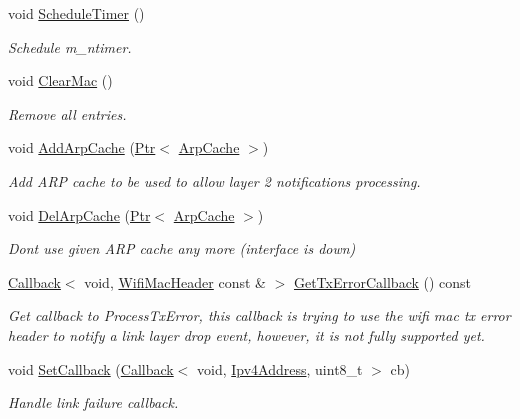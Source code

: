 \begin{DoxyCompactItemize}
void \hyperlink{classns3_1_1dsr_1_1DsrRouteCache_a1464bf3f9e4391942447afd1ce11c219}{Schedule\+Timer} ()
\begin{DoxyCompactList}\small\item\em Schedule m\+\_\+ntimer. \end{DoxyCompactList}\item 
void \hyperlink{classns3_1_1dsr_1_1DsrRouteCache_a901a02e075ccbd32082b1cb8cfe91607}{Clear\+Mac} ()
\begin{DoxyCompactList}\small\item\em Remove all entries. \end{DoxyCompactList}\item 
void \hyperlink{classns3_1_1dsr_1_1DsrRouteCache_aec3d7186e2b737e3f6d65a24145a3168}{Add\+Arp\+Cache} (\hyperlink{classns3_1_1Ptr}{Ptr}$<$ \hyperlink{classns3_1_1ArpCache}{Arp\+Cache} $>$)
\begin{DoxyCompactList}\small\item\em Add A\+RP cache to be used to allow layer 2 notifications processing. \end{DoxyCompactList}\item 
void \hyperlink{classns3_1_1dsr_1_1DsrRouteCache_ab2f4b5f658cd9e9829dc68290799fe1e}{Del\+Arp\+Cache} (\hyperlink{classns3_1_1Ptr}{Ptr}$<$ \hyperlink{classns3_1_1ArpCache}{Arp\+Cache} $>$)
\begin{DoxyCompactList}\small\item\em Don\textquotesingle{}t use given A\+RP cache any more (interface is down) \end{DoxyCompactList}\item 
\hyperlink{classns3_1_1Callback}{Callback}$<$ void, \hyperlink{classns3_1_1WifiMacHeader}{Wifi\+Mac\+Header} const \& $>$ \hyperlink{classns3_1_1dsr_1_1DsrRouteCache_add47d5b114fc61306122d31427e7a944}{Get\+Tx\+Error\+Callback} () const 
\begin{DoxyCompactList}\small\item\em Get callback to Process\+Tx\+Error, this callback is trying to use the wifi mac tx error header to notify a link layer drop event, however, it is not fully supported yet. \end{DoxyCompactList}\item 
void \hyperlink{classns3_1_1dsr_1_1DsrRouteCache_ad755962e071177f5bc81bcf4302803c0}{Set\+Callback} (\hyperlink{classns3_1_1Callback}{Callback}$<$ void, \hyperlink{classns3_1_1Ipv4Address}{Ipv4\+Address}, uint8\+\_\+t $>$ cb)
\begin{DoxyCompactList}\small\item\em Handle link failure callback. \end{DoxyCompactList}\item 

\end{DoxyCompactItemize}
